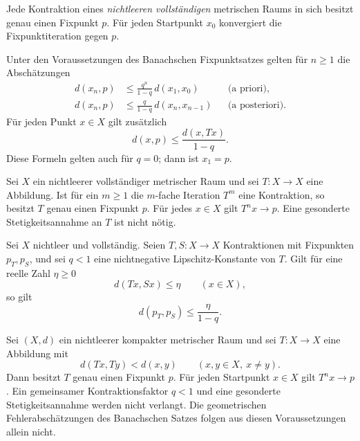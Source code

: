 \begin{theorem}
\label{b47guide:thm:banach}
Jede Kontraktion eines \emph{nichtleeren vollständigen} metrischen
Raums in sich besitzt genau einen Fixpunkt $p$.
Für jeden Startpunkt $x_0$ konvergiert die Fixpunktiteration gegen $p$.
\cite{banach-notes}
\end{theorem}

\begin{theorem}
\label{b47guide:thm:banach-errors}
Unter den Voraussetzungen des Banachschen Fixpunktsatzes gelten
für $n\geq1$ die Abschätzungen
\[
\begin{aligned}
 d(x_n,p)&\leq \frac{q^n}{1-q}\,d(x_1,x_0)
 &&\text{(a priori)},\\
 d(x_n,p)&\leq \frac{q}{1-q}\,d(x_n,x_{n-1})
 &&\text{(a posteriori)}.
\end{aligned}
\]
Für jeden Punkt $x\in X$ gilt zusätzlich
\[
 d(x,p)\leq\frac{d(x,Tx)}{1-q}.
\]
Diese Formeln gelten auch für $q=0$; dann ist $x_1=p$.
\cite{banach-notes}
\end{theorem}

\begin{theorem}
\label{b47guide:thm:iterated-contraction}
Sei $X$ ein nichtleerer vollständiger metrischer Raum und sei
$T:X\to X$ eine Abbildung. Ist für ein $m\geq1$ die $m$-fache
Iteration $T^m$ eine Kontraktion, so besitzt $T$ genau einen
Fixpunkt $p$. Für jedes $x\in X$ gilt $T^n x\to p$.
Eine gesonderte Stetigkeitsannahme an $T$ ist nicht nötig.
\end{theorem}

\begin{theorem}
\label{b47guide:thm:fixed-point-stability}
Sei $X$ nichtleer und vollständig. Seien $T,S:X\to X$
Kontraktionen mit Fixpunkten $p_T,p_S$, und sei $q<1$
eine nichtnegative Lipschitz-Konstante von $T$.
Gilt für eine reelle Zahl $\eta\geq0$
\[
 d(Tx,Sx)\leq\eta\qquad(x\in X),
\]
so gilt
\[
 d(p_T,p_S)\leq\frac{\eta}{1-q}.
\]
\end{theorem}

\begin{theorem}
\label{b47guide:thm:edelstein}
Sei $(X,d)$ ein nichtleerer kompakter metrischer Raum und sei $T:X\to X$
eine Abbildung mit
\[
 d(Tx,Ty)<d(x,y)\qquad(x,y\in X,\ x\ne y).
\]
Dann besitzt $T$ genau einen Fixpunkt $p$. Für jeden Startpunkt $x\in X$
gilt $T^n x\to p$.
Ein gemeinsamer Kontraktionsfaktor $q<1$ und eine gesonderte
Stetigkeitsannahme werden nicht verlangt. Die geometrischen
Fehlerabschätzungen des Banachschen Satzes folgen aus diesen
Voraussetzungen allein nicht. \cite{edelstein}
\end{theorem}
